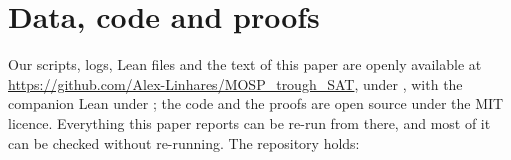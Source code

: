 \section*{Data, code and proofs}
\label{sec:data}

Our scripts, logs, Lean files and the text of this paper are openly
available at \url{https://github.com/Alex-Linhares/MOSP_trough_SAT},
under , with the companion Lean under
; the code and the
proofs are open source under the MIT licence. Everything this paper
reports can be re-run from there, and most of it can be checked without
re-running. The repository holds:
